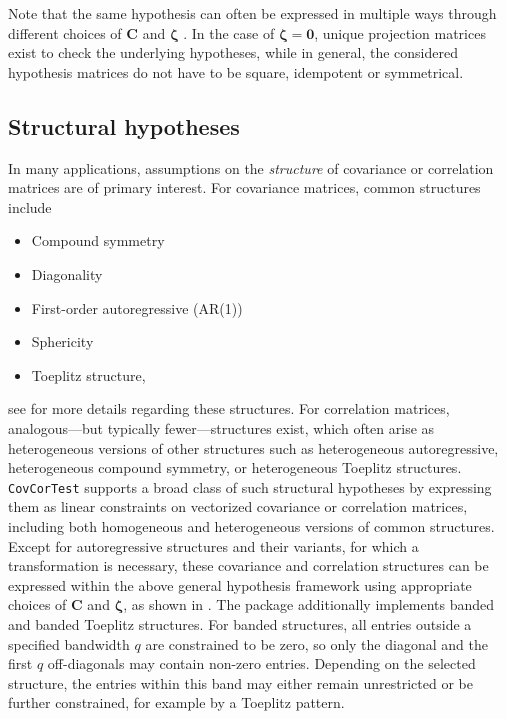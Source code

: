 Note that the same hypothesis can often be expressed in multiple ways through
different choices of \(\boldsymbol{C}\) and \(\boldsymbol{\zeta}\)
\citep[see][ for a detailed discussion]{sattler2023a, sattler2025}. In the case of
\(\boldsymbol{\zeta} = \mathbf{0}\), unique projection matrices exist to check the underlying
hypotheses, while in general, the considered hypothesis matrices do not have to
be square, idempotent or symmetrical.

\subsection{Structural hypotheses}\label{structural-hypotheses}

In many applications, assumptions on the \emph{structure} of covariance or
correlation matrices are of primary interest. For covariance matrices, common
structures include

\begin{itemize}
\item
  Compound symmetry
\item
  Diagonality
\item
  First-order autoregressive (AR(1))
\item
  Sphericity
\item
  Toeplitz structure,
\end{itemize}

see \citet{kincaid2005} for more details regarding these structures.
For correlation matrices, analogous---but typically fewer---structures exist, which
often arise as heterogeneous versions of other structures such as heterogeneous
autoregressive, heterogeneous compound symmetry, or heterogeneous Toeplitz
structures. \texttt{CovCorTest} supports a broad class of such structural
hypotheses by expressing them as linear constraints on vectorized covariance or
correlation matrices, including both homogeneous and heterogeneous versions of
common structures. Except for autoregressive structures and their variants, for
which a transformation is necessary, these covariance and correlation
structures can be expressed within the above general hypothesis framework using
appropriate choices of \(\boldsymbol{C}\) and \(\boldsymbol{\zeta}\), as shown in
\citet{sattler2024a}. The package additionally implements banded and banded
Toeplitz structures. For banded structures, all entries outside a specified
bandwidth \(q\) are constrained to be zero, so only the diagonal and the first
\(q\) off-diagonals may contain non-zero entries. Depending on the selected
structure, the entries within this band may either remain unrestricted or be
further constrained, for example by a Toeplitz pattern.


